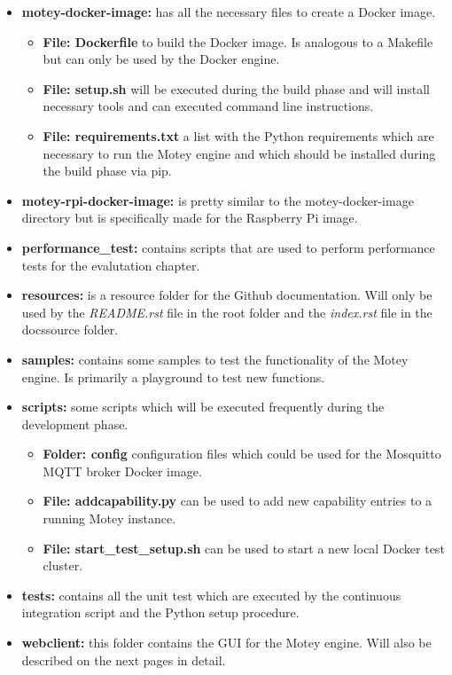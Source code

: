 \begin{itemize}
  \item{\textbf{motey-docker-image:}} has all the necessary files to create a Docker image.
  \begin{itemize}
    \item{\textbf{File: Dockerfile}} to build the Docker image. Is analogous to a Makefile but can only be used by the Docker engine.
    \item{\textbf{File: setup.sh}} will be executed during the build phase and will install necessary tools and can executed command line instructions.
    \item{\textbf{File: requirements.txt}} a list with the Python requirements which are necessary to run the Motey engine and which should be installed during the build phase via pip.
  \end{itemize}
  \item{\textbf{motey-rpi-docker-image:}} is pretty similar to the motey-docker-image directory but is specifically made for the Raspberry Pi image.
  \item{\textbf{performance\_test:}} contains scripts that are used to perform performance tests for the evalutation chapter.
  \item{\textbf{resources:}} is a resource folder for the Github documentation. Will only be used by the \textit{README.rst} file in the root folder and the \textit{index.rst} file in the docs\/source folder.
  \item{\textbf{samples:}} contains some samples to test the functionality of the Motey engine. Is primarily a playground to test new functions.
  \item{\textbf{scripts:}} some scripts which will be executed frequently during the development phase.
  \begin{itemize}
    \item{\textbf{Folder: config}} configuration files which could be used for the Mosquitto \ac{MQTT} broker Docker image.
    \item{\textbf{File: addcapability.py}} can be used to add new capability entries to a running Motey instance.
    \item{\textbf{File: start\_test\_setup.sh}} can be used to start a new local Docker test cluster.
  \end{itemize}
  \item{\textbf{tests:}} contains all the unit test which are executed by the continuous integration script and the Python setup procedure.
  \item{\textbf{webclient:}} this folder contains the \ac{GUI} for the Motey engine. Will also be described on the next pages in detail.
\end{itemize}

